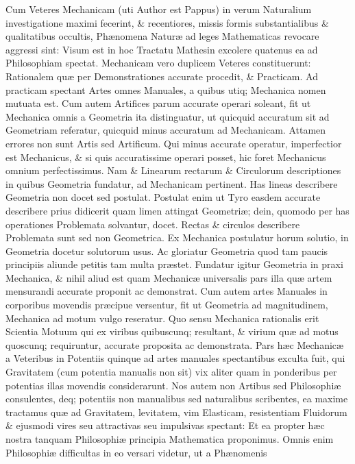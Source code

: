 \documentclass{ansarticle}
\begin{document}
Cum Veteres Mechanicam (uti Author est Pappus) in verum Naturalium
investigatione maximi fecerint, \& recentiores, missis formis
substantialibus \& qualitatibus occultis, Ph\ae{}nomena Natur\ae{} ad
leges Mathematicas revocare aggressi sint: Visum est in hoc Tractatu
Mathesin excolere quatenus ea ad Philosophiam spectat. Mechanicam vero
duplicem Veteres constituerunt: Rationalem qu\ae{} per Demonstrationes
accurate procedit, \& Practicam. Ad practicam spectant Artes omnes
Manuales, a quibus utiq; Mechanica nomen mutuata est. Cum autem
Artifices parum accurate operari soleant, fit ut Mechanica omnis a
Geometria ita distinguatur, ut quicquid accuratum sit ad Geometriam
referatur, quicquid minus accuratum ad Mechanicam. Attamen errores non
sunt Artis sed Artificum. Qui minus accurate operatur, imperfectior
est Mechanicus, \& si quis accuratissime operari posset, hic foret
Mechanicus omnium perfectissimus. Nam \& Linearum rectarum \&
Circulorum descriptiones in quibus Geometria fundatur, ad Mechanicam
pertinent. Has lineas describere Geometria non docet sed
postulat. Postulat enim ut Tyro easdem accurate describere prius
didicerit quam limen attingat Geometri\ae{}; dein, quomodo per has
operationes Problemata solvantur, docet. Rectas \& circulos describere
Problemata sunt sed non Geometrica. Ex Mechanica postulatur horum
solutio, in Geometria docetur solutorum usus. Ac gloriatur Geometria
quod tam paucis principiis aliunde petitis tam multa
pr\ae{}stet. Fundatur igitur Geometria in praxi Mechanica, \& nihil
aliud est quam Mechanic\ae{} universalis pars illa qu\ae{} artem
mensurandi accurate proponit ac demonstrat. Cum autem artes Manuales
in corporibus movendis pr\ae{}cipue versentur, fit ut Geometria ad
magnitudinem, Mechanica ad motum vulgo reseratur. Quo sensu Mechanica
rationalis erit Scientia Motuum qui ex viribus quibuscunq; resultant,
\& virium qu\ae{} ad motus quoscunq; requiruntur, accurate proposita
ac demonstrata. Pars h\ae{}c Mechanic\ae{} a Veteribus in Potentiis
quinque ad artes manuales spectantibus exculta fuit, qui Gravitatem
(cum potentia manualis non sit) vix aliter quam in ponderibus per
potentias illas movendis considerarunt. Nos autem non Artibus sed
Philosophi\ae{} consulentes, deq; potentiis non manualibus sed
naturalibus scribentes, ea maxime tractamus qu\ae{} ad Gravitatem,
levitatem, vim Elasticam, resistentiam Fluidorum \& ejusmodi vires seu
attractivas seu impulsivas spectant: Et ea propter h\ae{}c nostra
tanquam Philosophi\ae{} principia Mathematica proponimus. Omnis enim
Philosophi\ae{} difficultas in eo versari videtur, ut a Ph\ae{}nomenis
\end{document}
